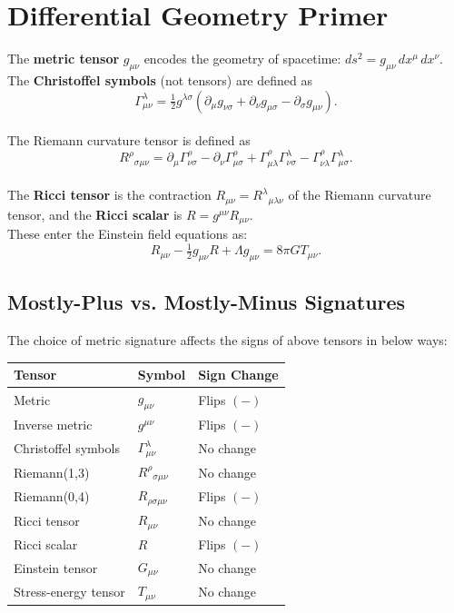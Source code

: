 \section{Differential Geometry Primer}

The \textbf{metric tensor} $g_{\mu\nu}$ encodes the geometry of spacetime:
$ds^2 = g_{\mu\nu}\,dx^\mu\,dx^\nu$.
The \textbf{Christoffel symbols} (not tensors) are defined as
\begin{equation}
  \Gamma^\lambda_{\mu\nu} = \tfrac{1}{2}g^{\lambda\sigma}
    (\partial_\mu g_{\nu\sigma} + \partial_\nu g_{\mu\sigma} - \partial_\sigma g_{\mu\nu}).
\end{equation} \\

The Riemann curvature tensor is defined as
\begin{equation}
  R^\rho{}_{\sigma\mu\nu} = \partial_\mu \Gamma^\rho_{\nu\sigma} - \partial_\nu \Gamma^\rho_{\mu\sigma} + \Gamma^\rho_{\mu\lambda}\Gamma^\lambda_{\nu\sigma} - \Gamma^\rho_{\nu\lambda}\Gamma^\lambda_{\mu\sigma}.
\end{equation} \\

The \textbf{Ricci tensor} is the contraction $R_{\mu\nu} = R^\lambda{}_{\mu\lambda\nu}$
of the Riemann curvature tensor, and the \textbf{Ricci scalar} is $R = g^{\mu\nu}R_{\mu\nu}$. \\

These enter the Einstein field equations as:
\begin{equation}
  R_{\mu\nu} - \tfrac{1}{2}g_{\mu\nu}R + \Lambda g_{\mu\nu} = 8\pi G T_{\mu\nu}.
\end{equation}

\subsection*{Mostly-Plus vs. Mostly-Minus Signatures}
The choice of metric signature affects the signs of above tensors in below ways:
\begin{center}
      \begin{tabular}{@{}lll@{}}
      \toprule
      \textbf{Tensor} & \textbf{Symbol} & \textbf{Sign Change} \\
      \midrule
      Metric& $g_{\mu\nu}$ & Flips $(-)$ \\
      Inverse metric & $g^{\mu\nu}$ & Flips $(-)$ \\
      Christoffel symbols & $\Gamma^\lambda_{\mu\nu}$ & No change \\
      Riemann(1,3) & $R^\rho{}_{\sigma\mu\nu}$ & No change \\
      Riemann(0,4) & $R_{\rho\sigma\mu\nu}$ & Flips $(-)$ \\
      Ricci tensor & $R_{\mu\nu}$ & No change \\
      Ricci scalar & $R$ & Flips $(-)$ \\
      Einstein tensor & $G_{\mu\nu}$ & No change \\
      Stress-energy tensor & $T_{\mu\nu}$ & No change \\
      \bottomrule
      \end{tabular}
\end{center}

